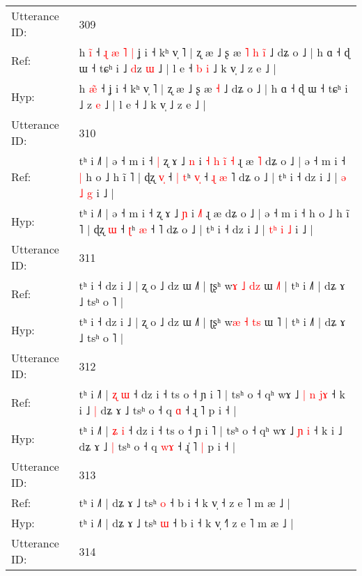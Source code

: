 \documentclass[10pt]{article}
\DeclareRobustCommand{\hl}[1]{{\textcolor{red}{#1}}}
\begin{document}
\begin{longtable}{ll}
Utterance ID: & 309 \\
Ref: & h \hl{i}̃ ˧\hl{ }\hl{ɻ}\hl{ }\hl{æ}\hl{ }\hl{˥}\hl{ }\hl{|} ʝ i ˧ kʰ v̩ ˥ | ʐ æ ˩ ʂ æ\hl{ }\hl{˥}\hl{ }\hl{h} \hl{i}\hl{̃} ˩ dʑ o ˩ | h ɑ ˧ ɖ ɯ ˧ tɕʰ i ˩ \hl{d}z \hl{ɯ} ˩ | l e ˧\hl{ }\hl{b}\hl{ }\hl{i} ˩ k v̩ ˩ z e ˩ |
 \\
Hyp: & h \hl{æ}̃ ˧\hl{}\hl{}\hl{}\hl{}\hl{}\hl{}\hl{}\hl{} ʝ i ˧ kʰ v̩ ˥ | ʐ æ ˩ ʂ æ\hl{}\hl{}\hl{}\hl{} \hl{}\hl{˧} ˩ dʑ o ˩ | h ɑ ˧ ɖ ɯ ˧ tɕʰ i ˩ \hl{}z \hl{e} ˩ | l e ˧\hl{}\hl{}\hl{}\hl{} ˩ k v̩ ˩ z e ˩ |
 \\
\midrule
Utterance ID: & 310 \\
Ref: & tʰ i ˩˥ | ə ˧ m i ˧\hl{ }\hl{|} ʐ ɤ ˩ \hl{n} i\hl{ }\hl{˧}\hl{ }\hl{h} \hl{i}\hl{̃}\hl{ }\hl{˧} ɻ æ\hl{ }\hl{˥} dʑ o ˩ | ə ˧ m i ˧\hl{ }\hl{|} h o ˩ h ĩ ˥ | ɖʐ \hl{v}\hl{̩} ˧\hl{ }\hl{|} \hl{t}ʰ \hl{v}\hl{̩} ˧\hl{ }\hl{ɻ}\hl{ }\hl{æ} ˥ dʑ o ˩ | tʰ i ˧ dz i ˩ | \hl{}\hl{ə} \hl{˩} \hl{g} i ˩ |
 \\
Hyp: & tʰ i ˩˥ | ə ˧ m i ˧\hl{}\hl{} ʐ ɤ ˩ \hl{ɲ} i\hl{}\hl{}\hl{}\hl{} \hl{}\hl{}\hl{˩}\hl{˥} ɻ æ\hl{}\hl{} dʑ o ˩ | ə ˧ m i ˧\hl{}\hl{} h o ˩ h ĩ ˥ | ɖʐ \hl{}\hl{ɯ} ˧\hl{}\hl{} \hl{ʈ}ʰ \hl{}\hl{æ} ˧\hl{}\hl{}\hl{}\hl{} ˥ dʑ o ˩ | tʰ i ˧ dz i ˩ | \hl{t}\hl{ʰ} \hl{i} \hl{˩} i ˩ |
 \\
\midrule
Utterance ID: & 311 \\
Ref: & tʰ i ˧ dz i ˩ | ʐ o ˩ dz ɯ ˩˥ | ʈʂʰ w\hl{ɤ} \hl{˩} \hl{d}\hl{z} ɯ \hl{˩}˥ | tʰ i ˩˥ | dʑ ɤ ˩ tsʰ o ˥ |
 \\
Hyp: & tʰ i ˧ dz i ˩ | ʐ o ˩ dz ɯ ˩˥ | ʈʂʰ w\hl{æ} \hl{˧} \hl{t}\hl{s} ɯ \hl{}˥ | tʰ i ˩˥ | dʑ ɤ ˩ tsʰ o ˥ |
 \\
\midrule
Utterance ID: & 312 \\
Ref: & tʰ i ˩˥ | \hl{ʐ} \hl{ɯ} ˧ dz i ˧ ts o ˧ ɲ i ˥ | tsʰ o ˧ qʰ wɤ ˩\hl{ }\hl{|} \hl{n} \hl{j}\hl{ɤ} ˧ k i ˩\hl{ }\hl{|} dʑ ɤ ˩\hl{}\hl{} tsʰ o ˧ q \hl{}\hl{ɑ} ˧ ɻ\hl{} ˥\hl{}\hl{} p i ˧ |
 \\
Hyp: & tʰ i ˩˥ | \hl{ʑ} \hl{i} ˧ dz i ˧ ts o ˧ ɲ i ˥ | tsʰ o ˧ qʰ wɤ ˩\hl{}\hl{} \hl{ɲ} \hl{}\hl{i} ˧ k i ˩\hl{}\hl{} dʑ ɤ ˩\hl{ }\hl{|} tsʰ o ˧ q \hl{w}\hl{ɤ} ˧ ɻ\hl{̍} ˥\hl{ }\hl{|} p i ˧ |
 \\
\midrule
Utterance ID: & 313 \\
Ref: & tʰ i ˩˥ | dʑ ɤ ˩ tsʰ \hl{o} ˧ b i ˧ k v̩ ˧\hl{} z e ˥ m æ ˩ |
 \\
Hyp: & tʰ i ˩˥ | dʑ ɤ ˩ tsʰ \hl{ɯ} ˧ b i ˧ k v̩ ˧\hl{˥} z e ˥ m æ ˩ |
 \\
\midrule
Utterance ID: & 314 \\

\end{longtable}
\end{document}
